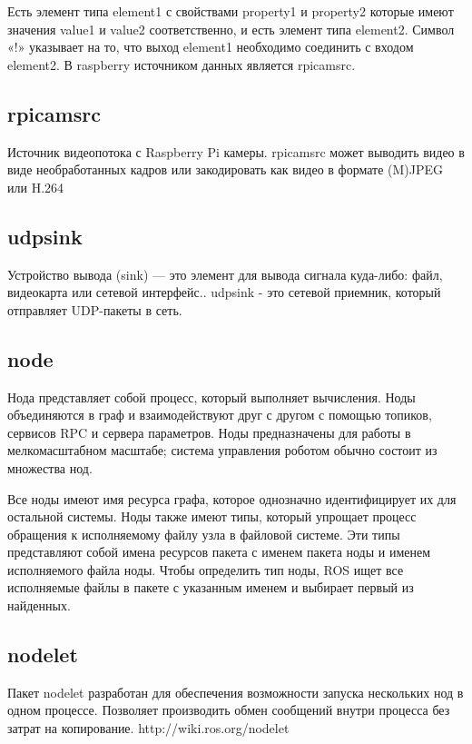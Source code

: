 Есть элемент типа element1 с свойствами property1 и property2 которые имеют значения value1 и value2 соответственно, и есть элемент типа element2. Символ «!» указывает на то, что выход element1 необходимо соединить с входом element2.
В raspberry источником данных является rpicamsrc.

\subsection{rpicamsrc}

Источник видеопотока с Raspberry Pi камеры. rpicamsrc может выводить видео в виде необработанных кадров или закодировать как видео в формате (M)JPEG или H.264 
\subsection{udpsink}
Устройство вывода (sink) — это элемент для вывода сигнала куда-либо:  файл, видеокарта или сетевой интерфейс.. 
udpsink - это сетевой приемник, который отправляет UDP-пакеты в сеть.

\subsection{node}
Нода представляет собой процесс, который выполняет вычисления. Ноды объединяются в граф и взаимодействуют друг с другом с помощью топиков, сервисов RPC и сервера параметров. Ноды предназначены для работы в мелкомасштабном масштабе; система управления роботом обычно состоит из множества нод.

Все ноды имеют имя ресурса графа, которое однозначно идентифицирует их для остальной системы. Ноды также имеют типы, который упрощает процесс обращения к исполняемому файлу узла в файловой системе. Эти типы представляют собой имена ресурсов пакета с именем пакета ноды и именем исполняемого файла ноды. Чтобы определить тип ноды, ROS ищет все исполняемые файлы в пакете с указанным именем и выбирает первый из найденных. 
\subsection{nodelet}
Пакет nodelet разработан для обеспечения возможности запуска нескольких нод в одном процессе. Позволяет производить обмен сообщений внутри процесса без затрат на копирование.
http://wiki.ros.org/nodelet
